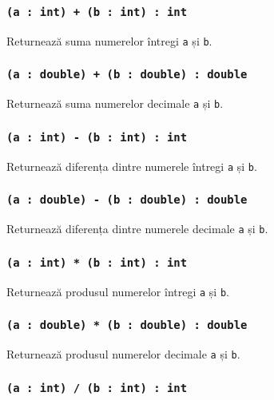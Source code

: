 \subsubsection{\texttt{(a : int) + (b : int) : int}}

Returnează suma numerelor întregi \texttt{a} și \texttt{b}.

\subsubsection{\texttt{(a : double) + (b : double) : double}}

Returnează suma numerelor decimale \texttt{a} și \texttt{b}.

\subsubsection{\texttt{(a : int) - (b : int) : int}}

Returnează diferența dintre numerele întregi \texttt{a} și \texttt{b}.

\subsubsection{\texttt{(a : double) - (b : double) : double}}

Returnează diferența dintre numerele decimale \texttt{a} și \texttt{b}.

\subsubsection{\texttt{(a : int) * (b : int) : int}}

Returnează produsul numerelor întregi \texttt{a} și \texttt{b}.

\subsubsection{\texttt{(a : double) * (b : double) : double}}

Returnează produsul numerelor decimale \texttt{a} și \texttt{b}.

\subsubsection{\texttt{(a : int) / (b : int) : int}}

